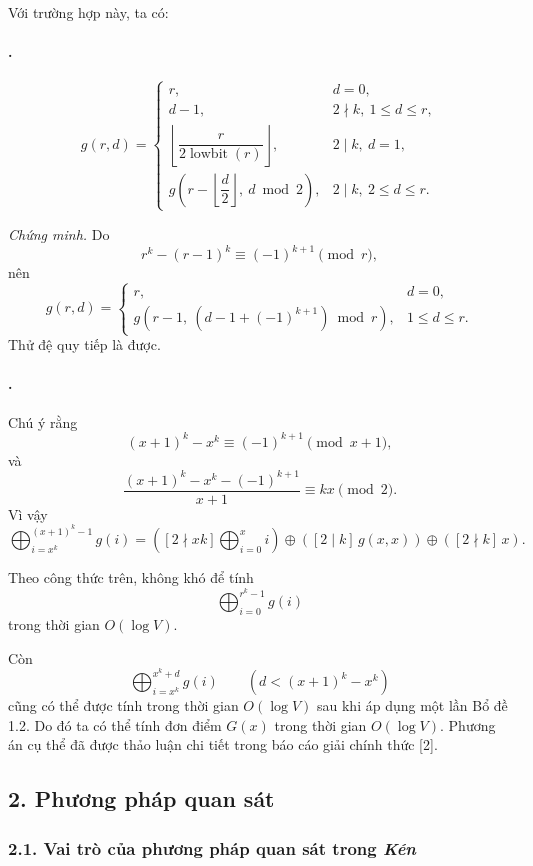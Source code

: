 \documentclass[11pt]{article}
\begin{document}
Với trường hợp này, ta có:

\paragraph{.}
\[
g(r,d)=
\begin{cases}
r, & d=0,\\
d-1, & 2\nmid k,\ 1\le d\le r,\\
\left\lfloor\dfrac{r}{2\operatorname{lowbit}(r)}\right\rfloor,
  & 2\mid k,\ d=1,\\
g\!\left(r-\left\lfloor\dfrac d2\right\rfloor,\ d\bmod 2\right),
  & 2\mid k,\ 2\le d\le r.
\end{cases}
\]

\emph{Chứng minh.}
Do
\[
  r^k-(r-1)^k\equiv (-1)^{k+1}\pmod r,
\]
nên
\[
g(r,d)=
\begin{cases}
r, & d=0,\\
g\!\left(r-1,\ (d-1+(-1)^{k+1})\bmod r\right), & 1\le d\le r.
\end{cases}
\]
Thử đệ quy tiếp là được.

\paragraph{.}
Chú ý rằng
\[
  (x+1)^k-x^k\equiv (-1)^{k+1}\pmod{x+1},
\]
và
\[
  \frac{(x+1)^k-x^k-(-1)^{k+1}}{x+1}\equiv kx\pmod 2.
\]
Vì vậy
\[
  \bigoplus_{i=x^k}^{(x+1)^k-1} g(i)
  =
  \left([2\nmid xk]\bigoplus_{i=0}^{x} i\right)
  \oplus ([2\mid k]\,g(x,x))\oplus([2\nmid k]\,x).
\]

Theo công thức trên, không khó để tính
\[
  \bigoplus_{i=0}^{r^k-1} g(i)
\]
trong thời gian \(O(\log V)\).

Còn
\[
  \bigoplus_{i=x^k}^{x^k+d} g(i)\qquad \left(d<(x+1)^k-x^k\right)
\]
cũng có thể được tính trong thời gian \(O(\log V)\) sau khi áp dụng một lần
Bổ đề 1.2. Do đó ta có thể tính đơn điểm \(G(x)\) trong thời gian
\(O(\log V)\). Phương án cụ thể đã được thảo luận chi tiết trong báo cáo giải
chính thức [2].

\subsection*{2. Phương pháp quan sát}

\subsubsection*{2.1. Vai trò của phương pháp quan sát trong \emph{Kén}}
\end{document}
